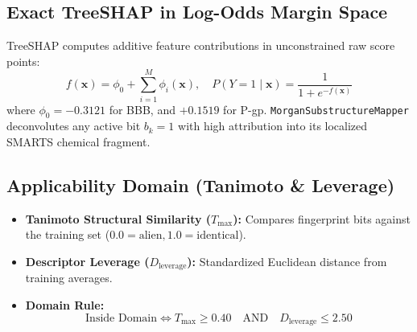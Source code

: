 \documentclass[11pt,a4paper]{article}
\begin{document}
\subsection{Exact TreeSHAP in Log-Odds Margin Space}
\begin{mathspecbox}
TreeSHAP computes additive feature contributions in unconstrained raw score points:
\begin{equation}
f(\mathbf{x}) = \phi_0 + \sum_{i=1}^M \phi_i(\mathbf{x}), \quad P(Y = 1 \mid \mathbf{x}) = \frac{1}{1 + e^{-f(\mathbf{x})}}
\end{equation}
where $\phi_0 = -0.3121$ for BBB, and $+0.1519$ for P-gp.
\texttt{MorganSubstructureMapper} deconvolutes any active bit $b_k = 1$ with high attribution into its localized SMARTS chemical fragment.
\end{mathspecbox}

\subsection{Applicability Domain (Tanimoto \& Leverage)}
\begin{mathspecbox}
\begin{itemize}[leftmargin=*]
    \item \textbf{Tanimoto Structural Similarity ($T_{\max}$):} Compares fingerprint bits against the training set ($0.0 = \text{alien}, 1.0 = \text{identical}$).
    \item \textbf{Descriptor Leverage ($D_{\text{leverage}}$):} Standardized Euclidean distance from training averages.
    \item \textbf{Domain Rule:}
    \begin{equation}
    \text{Inside Domain} \iff T_{\max} \ge 0.40 \quad \text{AND} \quad D_{\text{leverage}} \le 2.50
    \end{equation}
\end{itemize}
\end{mathspecbox}
\end{document}
